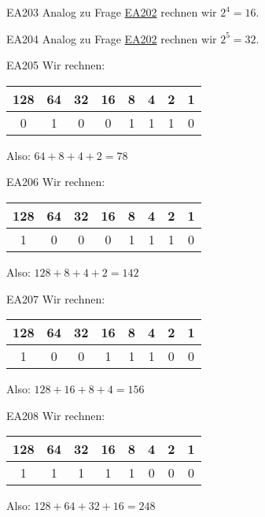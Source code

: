 \documentclass[10pt,a4paper,ngerman]{article}
\theoremstyle{definition}
\theoremstyle{plain}
\theoremstyle{mytheorem}
\newcommand{\qref}[1]{\hyperref[#1]{#1}}
\theoremstyle{definition}
\begin{document}
\begin{sol}{EA203}
Analog zu Frage \qref{EA202} rechnen wir $2^4 = 16$.
\end{sol}

\begin{sol}{EA204}
Analog zu Frage \qref{EA202} rechnen wir $2^5 = 32$.
\end{sol}


\begin{sol}{EA205}
  Wir rechnen:
  \begin{center}
\begin{tabular}{|c|c|c|c|c|c|c|c|} 
128& 64&32&16 &8 & 4 & 2 & 1 \\ \hline
0&1&0&0&1&1&1&0
\end{tabular}

\end{center}
Also: $64+8+4+2 = 78$ 
\end{sol} 

\begin{sol}{EA206}
  Wir rechnen:
  \begin{center}
\begin{tabular}{|c|c|c|c|c|c|c|c|} 
128& 64&32&16 &8 & 4 & 2 & 1 \\ \hline
1&0&0&0&1&1&1&0
\end{tabular}

\end{center}
Also: $128+8+4+2 = 142$ 
\end{sol}  


\begin{sol}{EA207}
  Wir rechnen:
  \begin{center}
\begin{tabular}{|c|c|c|c|c|c|c|c|} 
128& 64&32&16 &8 & 4 & 2 & 1 \\ \hline
1&0&0&1&1&1&0&0
\end{tabular}
\end{center}
Also: $128+16+8+4 = 156$ 
\end{sol}  


\begin{sol}{EA208}
  Wir rechnen:
  \begin{center}
\begin{tabular}{|c|c|c|c|c|c|c|c|} 
128& 64&32&16 &8 & 4 & 2 & 1 \\ \hline
1&1&1&1&1&0&0&0
\end{tabular}
\end{center}
Also: $128+64+32+16 = 248$ 
\end{sol}  
\end{document}
